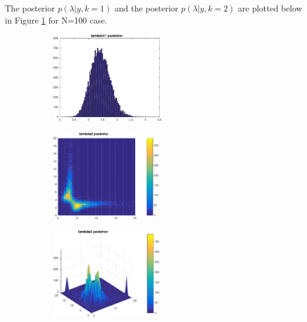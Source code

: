 \documentclass{article}
\begin{document}
The posterior $p(\lambda|y,k=1)$ and the posterior $p(\lambda|y,k=2)$ are plotted below in Figure \ref{fig:posteriors} for N=100 case.

\begin{figure}
\centering
\begin{subfigure}{0.3 \textwidth}
\centering
\includegraphics[height=1.5in]{lambda_11}
\caption{}
\end{subfigure}
\begin{subfigure}{0.3 \textwidth}
\centering
\includegraphics[height=1.5in]{lambda_22}
\caption{}
\end{subfigure}
\begin{subfigure}{0.3 \textwidth}
\centering
\includegraphics[height=1.5in]{lambda_22_3d}
\caption{}
\end{subfigure}
\caption{}
\label{fig:posteriors}
\end{figure}
\end{document}
